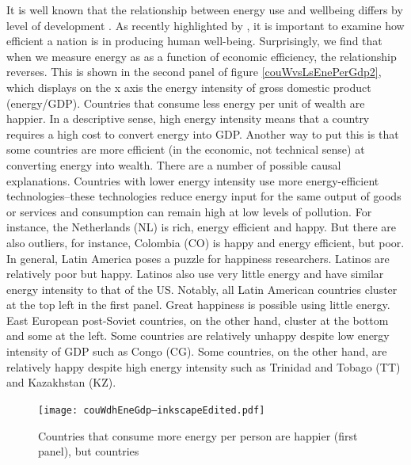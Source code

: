 \documentclass[10pt, letterpaper]{article}
\begin{document}
\begin{spacing}{1.5}
It is well known that the relationship between energy use and wellbeing differs
by level of development \citep[e.g.,][]{jorgenson15b,knight11}.
As recently highlighted by \citet{dietz09}, it is important to examine
how efficient a nation is in  producing human well-being.
%
Surprisingly,  we find that when we measure energy as as a function of economic
efficiency, the relationship reverses.  This is shown in the second panel of
figure \ref{couWvsLsEnePerGdp2}, which displays on the x axis the energy intensity of gross domestic product (energy/GDP). Countries that consume less energy per unit of wealth are happier. 
%
In a descriptive sense, high energy intensity means that a country requires
a high cost to convert energy into GDP. Another way to put this is that some
countries are more efficient (in the economic, not technical sense) at
converting energy into wealth. There are a number of possible causal explanations.  Countries with lower energy intensity  use
 more energy-efficient technologies--these technologies reduce energy input 
for the same output of goods or services and consumption can remain high at low
levels of pollution.
 For instance,  the Netherlands (NL) is rich,  energy efficient and happy. But
 there are also outliers, for instance,  Colombia (CO) is  happy and energy
 efficient,  but poor.  
In general, Latin America poses a puzzle for happiness researchers. Latinos are
relatively poor but happy. Latinos also use very little  energy and have similar energy intensity to that of the  US. Notably, all Latin
 American countries cluster at the top left in the
first panel.  Great happiness is possible using little  energy. East European
post-Soviet countries, on the other hand, cluster at the bottom and some at the
left. Some countries are relatively unhappy despite low energy intensity of GDP such as Congo (CG). Some countries, on the other hand, are relatively happy
despite high energy intensity such as Trinidad and Tobago (TT) and Kazakhstan (KZ).    
\begin{figure}[H]
 \texttt{[image: couWdhEneGdp--inkscapeEdited.pdf]}\centering \caption{Countries
   that consume more energy per person are happier (first panel), but countries
}
\end{figure}
\end{spacing}
\end{document}
